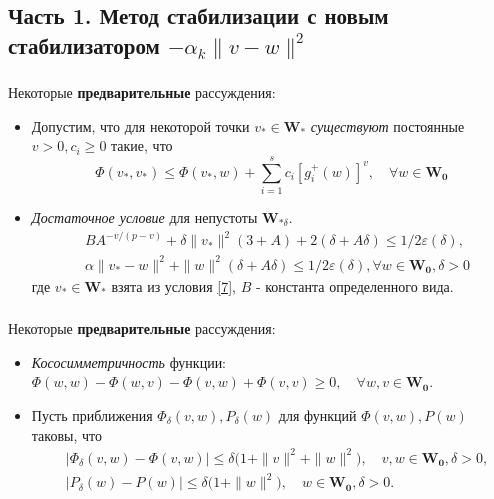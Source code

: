 \documentclass[unicode, t, 11pt]{beamer}%
\begin{document}
\subsection{Часть 1. Метод стабилизации с новым стабилизатором $-\alpha_k\|v-w\|^2$}
\begin{frame}
\frametitle{\insertsection}
\framesubtitle{\insertsubsection}
Некоторые \textbf{предварительные} рассуждения:
\begin{itemize}[label=\(\bullet\)]
	\item Допустим, что для некоторой точки $v_*\in \mathbf{W_*}$ \textit{существуют} постоянные $v>0,c_i\geqslant 0$ такие, что
\begin{equation}
\label{7}
\Phi(v_*,v_*)\leqslant \Phi(v_*,w)+\sum_{i=1}^{s} c_i[g_i^+(w)]^v,\quad \forall w\in\mathbf{W_0}
\end{equation}
	\item \emph{Достаточное условие} для непустоты $\mathbf{W}_{*\delta}$.
	\begin{equation}
	\label{13}
	\begin{aligned}
	&BA^{-v/(p-v)}+\delta\|v_*\|^2(3+A)+2(\delta+A\delta)\leqslant 1/2\varepsilon(\delta),\\ &\alpha\|v_*-w\|^2+\|w\|^2(\delta+A\delta)\leqslant 1/2 \varepsilon(\delta),\forall w\in \mathbf{W_0},\delta>0
	\end{aligned}
	\end{equation}
	где $v_*\in \mathbf{W}_*$ взята из условия \eqref{7}, $B$ - константа определенного вида.
\end{itemize}
\end{frame}
\begin{frame}
\frametitle{\insertsection}
\framesubtitle{\insertsubsection}
Некоторые \textbf{предварительные} рассуждения:
\begin{center}
	\begin{itemize}[label=\(\bullet\)]
		\item \textit{Кососимметричность} функции: $\Phi(w,w)-\Phi(w,v)-\Phi(v,w)+\Phi(v,v)\geqslant 0,\quad \forall w,v\in \mathbf{W_0}$.
		\item Пусть приближения $\Phi_{\delta}(v,w),P_{\delta}(w)$ для функций $\Phi(v,w),P(w)$ таковы, что
		\begin{equation}
		\label{noise}
		\begin{aligned}
		&\big|\Phi_{\delta}(v,w)-\Phi(v,w)\big|\leqslant \delta\big(1+\|v\|^2+\|w\|^2\big),\quad v,w\in\mathbf{W_0},\delta >0,\\
		&\big|P_{\delta}(w)-P(w)\big|\leqslant \delta\big(1+\|w\|^2\big),\quad w\in\mathbf{W_0},\delta >0.
		\end{aligned}
		\end{equation}
	\end{itemize}
\end{center}
\end{frame}
\end{document}
